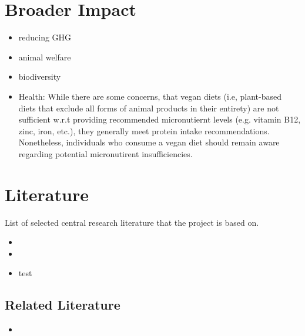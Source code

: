\documentclass{article}
\begin{document}
\section*{Broader Impact}

\begin{itemize}
\item reducing GHG
\item animal welfare
\item biodiversity
\item Health: While there are some concerns, that vegan diets (i.e, plant-based diets that exclude all forms of animal products in their entirety) are not sufficient w.r.t providing recommended micronutiernt levels (e.g. vitamin B12, zinc, iron, etc.), they generally meet protein intake recommendations. Nonetheless, individuals who consume a vegan diet should remain aware regarding potential micronutirent insufficiencies. 
\end{itemize}



\section*{Literature}

List of selected central research literature that the project is based on.


\begin{itemize}
  \item {}
  \item {}
  \item test \citet{WHO2021}
\end{itemize}

\subsection{Related Literature}
\begin{itemize}
  \item {}
\end{itemize}


{\small


}
\end{document}
